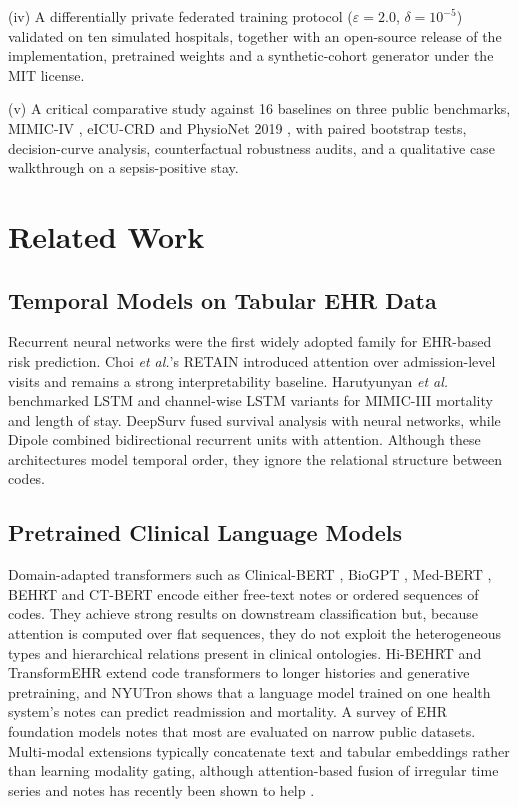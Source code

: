 \documentclass[conference]{IEEEtran}
\begin{document}
(iv) A differentially private federated training protocol ($\varepsilon=2.0$, $\delta=10^{-5}$) validated on ten simulated hospitals, together with an open-source release of the implementation, pretrained weights and a synthetic-cohort generator under the MIT license.

(v) A critical comparative study against 16 baselines on three public benchmarks, MIMIC-IV \cite{johnson2023mimiciv}, eICU-CRD \cite{pollard2018eicu} and PhysioNet 2019 \cite{reyna2020}, with paired bootstrap tests, decision-curve analysis, counterfactual robustness audits, and a qualitative case walkthrough on a sepsis-positive stay.

\section{Related Work}
\subsection{Temporal Models on Tabular EHR Data}
Recurrent neural networks were the first widely adopted family for EHR-based risk prediction. Choi \textit{et al.}'s RETAIN \cite{choi2016retain} introduced attention over admission-level visits and remains a strong interpretability baseline. Harutyunyan \textit{et al.} \cite{harutyunyan2019} benchmarked LSTM and channel-wise LSTM variants for MIMIC-III mortality and length of stay. DeepSurv \cite{katzman2018deepsurv} fused survival analysis with neural networks, while Dipole \cite{ma2017dipole} combined bidirectional recurrent units with attention. Although these architectures model temporal order, they ignore the relational structure between codes.

\subsection{Pretrained Clinical Language Models}
Domain-adapted transformers such as Clinical-BERT \cite{alsentzer2019}, BioGPT \cite{luo2022biogpt}, Med-BERT \cite{rasmy2021medbert}, BEHRT \cite{li2020behrt} and CT-BERT \cite{yang2022gatortron} encode either free-text notes or ordered sequences of codes. They achieve strong results on downstream classification but, because attention is computed over flat sequences, they do not exploit the heterogeneous types and hierarchical relations present in clinical ontologies. Hi-BEHRT \cite{li2023hibehrt} and TransformEHR \cite{yang2023transformehr} extend code transformers to longer histories and generative pretraining, and NYUTron \cite{jiang2023nyutron} shows that a language model trained on one health system's notes can predict readmission and mortality. A survey of EHR foundation models \cite{wornow2023} notes that most are evaluated on narrow public datasets. Multi-modal extensions typically concatenate text and tabular embeddings rather than learning modality gating, although attention-based fusion of irregular time series and notes has recently been shown to help \cite{zhang2023icml}.
\end{document}
